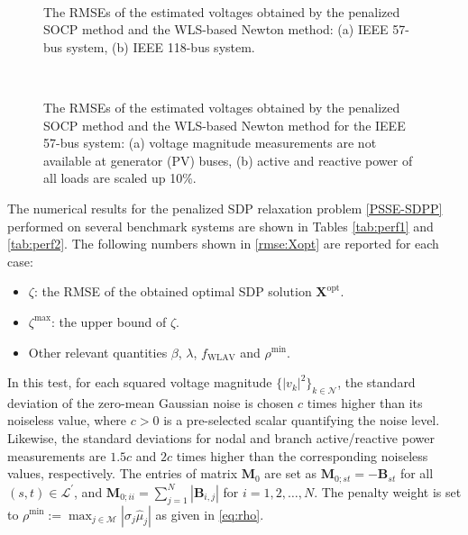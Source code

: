 \documentclass[journal,twoside]{IEEEtran}
\newcommand{\bX}{\mathbf{X}}
\newcommand{\cL}{{\mathcal L}}
\newcommand{\cM}{{\mathcal M}}
\newcommand{\cN}{{\mathcal N}}
\begin{document}
\begin{figure}[t]
	\centering
	\hspace{-0.7cm}\\
	\hspace{-0.7cm}
	\caption{The RMSEs of the estimated voltages obtained by the penalized SOCP method and the WLS-based Newton method: (a) IEEE 57-bus system, (b) IEEE 118-bus system.}\label{WLS_Newton}
\end{figure}


\begin{figure}[t]
	\centering
	\hspace{-0.7cm}\\
	\hspace{-0.7cm}
	\caption{The RMSEs of the estimated voltages obtained by the penalized SOCP method and the WLS-based  Newton method for the IEEE 57-bus system: (a) voltage magnitude measurements are not available at generator (PV) buses, (b) active and reactive power of all loads are scaled up 10\%.}\label{WLS_Newton_2}
\end{figure}


The numerical results for the penalized SDP relaxation problem \eqref{PSSE-SDPP} performed on several benchmark systems are shown in Tables \ref{tab:perf1} and \ref{tab:perf2}. The following numbers shown in \eqref{rmse:Xopt} are reported for each case:
\begin{itemize}
\item $\zeta$: the RMSE of the obtained optimal SDP solution $\bX^{\text{opt}}$. 
\item $\zeta^{\text{max}}$: the upper bound of $\zeta$.
\item Other relevant quantities $\beta$, $\lambda$, $f_{\text{WLAV}}$ and $\rho^{\text{min}}$.
\end{itemize}
In this test, for each squared voltage magnitude $\{|v_k|^2\}_{k\in \cN}$, the standard deviation of the zero-mean Gaussian noise is chosen $c$ times higher than its noiseless value, where $c>0$ is a pre-selected scalar quantifying the noise level. Likewise, the standard deviations for nodal and branch active/reactive power measurements are $1.5c$ and $2c$ times higher than the corresponding noiseless values, respectively. 
The entries of matrix $\mathbf{M}_0$ are set as  $\mathbf{M}_{0;st} = -\mathbf{B}_{st}$ for all
$(s,t)\in\cL^{\prime}$, and  $\mathbf{M}_{0;ii} = \sum_{j=1}^N|\mathbf{B}_{i,j}|$ for $i=1,2,\ldots,N$.
The penalty weight is set to $\rho^{\text{min}}:= \max_{j\in\cM} |\sigma_j\hat{\mu}_j|$ as given in \eqref{eq:rho}.
\end{document}
